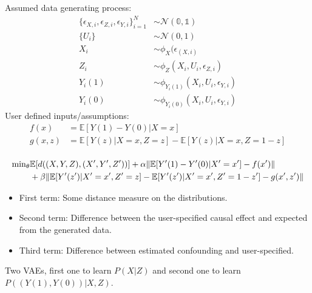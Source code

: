 \documentclass{beamer}
\DeclarePairedDelimiter\norm{\lVert}{\rVert}%
\begin{document}
\begin{frame}
	Assumed data generating process:
	\begin{equation}
		\begin{split}
			\{ \epsilon_{X, i}, \epsilon_{Z, i}, \epsilon_{Y, i} \}_{i=1}^N & \sim \mathcal{N}(\mathbb{0}, \mathbb{1}) \\
			\{ U_i \} & \sim \mathcal{N}(0, 1) \\
			X_i & \sim \phi_X(\epsilon_(X, i) \\
			Z_i & \sim \phi_Z(X_i, U_i, \epsilon_{Z, i}) \\
			Y_i(1) & \sim \phi_{Y_i(1)} (X_i, U_i, \epsilon_{Y, i}) \\
			Y_i(0) & \sim \phi_{Y_i(0)} (X_i, U_i, \epsilon_{Y, i})
		\end{split}
	\end{equation}
	User defined inputs/assumptions:
	\begin{equation}
		\begin{split}
			f(x) &= \mathbb{E}[Y(1) - Y(0) | X=x] \\
			g(x, z) &= \mathbb{E}[Y(z) | X=x, Z=z] - \mathbb{E}[Y(z) | X=x, Z=1-z] \\
		\end{split}
	\end{equation}
\end{frame}
\begin{frame}
	\begin{equation}
		\begin{split}
			\mathbf{\min}_{\theta} & \mathbb{E}[d((X, Y, Z), (X', Y', Z'))] + \alpha \norm{\mathbb{E}[Y'(1) - Y'(0) | X' = x'] -f(x') } \\
						& + \beta \norm{\mathbb{E}[Y'(z') | X'=x', Z'=z] - \mathbb{E}[Y'(z') | X'=x', Z'=1-z'] -g(x', z')}
		\end{split}
	\end{equation}

	\begin{itemize}
		\item First term: Some distance measure on the distributions.
		\item Second term: Difference between the user-specified causal effect and expected from the generated data.
		\item Third term: Difference between estimated confounding and user-specified.
	\end{itemize}
	Two VAEs, first one to learn $ P(X | Z) $ and second one to learn $ P((Y(1), Y(0)) | X, Z) $.
\end{frame}
\end{document}
